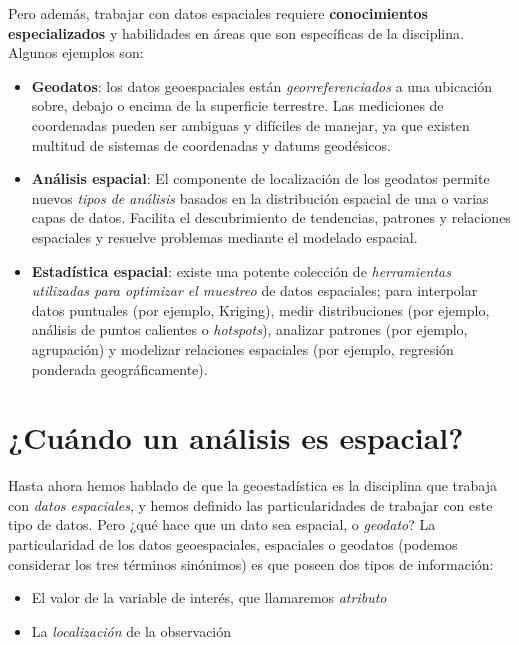 \documentclass[
  letterpaper,
  DIV=11,
  numbers=noendperiod]{scrreprt}
\providecommand{\tightlist}{%
  \setlength{\itemsep}{0pt}\setlength{\parskip}{0pt}}\usepackage{longtable,booktabs,array}
\begin{document}
Pero además, trabajar con datos espaciales requiere
\textbf{conocimientos especializados} y habilidades en áreas que son
específicas de la disciplina. Algunos ejemplos son:

\begin{itemize}
\item
  \textbf{Geodatos}: los datos geoespaciales están
  \emph{georreferenciados} a una ubicación sobre, debajo o encima de la
  superficie terrestre. Las mediciones de coordenadas pueden ser
  ambiguas y difíciles de manejar, ya que existen multitud de sistemas
  de coordenadas y datums geodésicos.
\item
  \textbf{Análisis espacial}: El componente de localización de los
  geodatos permite nuevos \emph{tipos de análisis} basados en la
  distribución espacial de una o varias capas de datos. Facilita el
  descubrimiento de tendencias, patrones y relaciones espaciales y
  resuelve problemas mediante el modelado espacial.
\item
  \textbf{Estadística espacial}: existe una potente colección de
  \emph{herramientas utilizadas para optimizar el muestreo} de datos
  espaciales; para interpolar datos puntuales (por ejemplo, Kriging),
  medir distribuciones (por ejemplo, análisis de puntos calientes o
  \emph{hotspots}), analizar patrones (por ejemplo, agrupación) y
  modelizar relaciones espaciales (por ejemplo, regresión ponderada
  geográficamente).
\end{itemize}

\hypertarget{cuuxe1ndo-un-anuxe1lisis-es-espacial}{%
\section*{¿Cuándo un análisis es
espacial?}\label{cuuxe1ndo-un-anuxe1lisis-es-espacial}}


Hasta ahora hemos hablado de que la geoestadística es la disciplina que
trabaja con \emph{datos espaciales}, y hemos definido las
particularidades de trabajar con este tipo de datos. Pero ¿qué hace que
un dato sea espacial, o \emph{geodato}? La particularidad de los datos
geoespaciales, espaciales o geodatos (podemos considerar los tres
términos sinónimos) es que poseen dos tipos de información:

\begin{itemize}
\tightlist
\item
  El valor de la variable de interés, que llamaremos \emph{atributo}
\item
  La \emph{localización} de la observación
\end{itemize}
\end{document}
